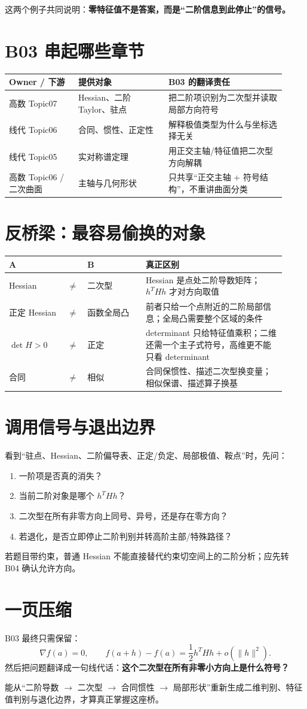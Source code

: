 \documentclass[profile=standard]{ipara-handbook}
\begin{document}
这两个例子共同说明：\textbf{零特征值不是答案，而是“二阶信息到此停止”的信号。}

\section{B03 串起哪些章节}
\begin{tabular}{p{0.23\linewidth}p{0.30\linewidth}p{0.39\linewidth}}
\hline
Owner / 下游 & 提供对象 & B03 的翻译责任\\
\hline
高数 Topic07 & Hessian、二阶 Taylor、驻点 & 把二阶项识别为二次型并读取局部方向符号\\
线代 Topic06 & 合同、惯性、正定性 & 解释极值类型为什么与坐标选择无关\\
线代 Topic05 & 实对称谱定理 & 用正交主轴/特征值把二次型方向解耦\\
高数 Topic06 / 二次曲面 & 主轴与几何形状 & 只共享“正交主轴 + 符号结构”，不重讲曲面分类\\
\hline
\end{tabular}

\section{反桥梁：最容易偷换的对象}
\begin{tabular}{p{0.20\linewidth}p{0.04\linewidth}p{0.20\linewidth}p{0.48\linewidth}}
\hline
A & & B & 真正区别\\
\hline
Hessian & $\neq$ & 二次型 & Hessian 是点处二阶导数矩阵；$h^THh$ 才对方向取值\\
正定 Hessian & $\neq$ & 函数全局凸 & 前者只给一个点附近的二阶局部信息；全局凸需要整个区域的条件\\
$\det H>0$ & $\neq$ & 正定 & determinant 只给特征值乘积；二维还需一个主子式符号，高维更不能只看 determinant\\
合同 & $\neq$ & 相似 & 合同保惯性、描述二次型换变量；相似保谱、描述算子换基\\
\hline
\end{tabular}

\section{调用信号与退出边界}
看到“驻点、Hessian、二阶偏导表、正定/负定、局部极值、鞍点”时，先问：
\begin{enumerate}
\item 一阶项是否真的消失？
\item 当前二阶对象是哪个 $h^THh$？
\item 二次型在所有非零方向上同号、异号，还是存在零方向？
\item 若退化，是否立即停止二阶判别并转高阶主部/特殊路径？
\end{enumerate}

若题目带约束，普通 Hessian 不能直接替代约束切空间上的二阶分析；应先转 B04 确认允许方向。

\section{一页压缩}
B03 最终只需保留：
\[
\boxed{
\nabla f(a)=0,
\qquad
f(a+h)-f(a)=\frac12h^THh+o(\lVert h\rVert^2).
}
\]
然后把问题翻译成一句线代话：\textbf{这个二次型在所有非零小方向上是什么符号？}

能从“二阶导数 $\to$ 二次型 $\to$ 合同惯性 $\to$ 局部形状”重新生成二维判别、特征值判别与退化边界，才算真正掌握这座桥。
\end{document}
